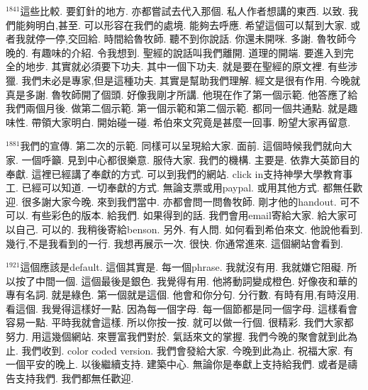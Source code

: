 \documentclass{book}
\begin{document}
$^{1841}$這些比較.
要釘針的地方.
亦都嘗試去代入那個.
私人作者想講的東西.
以致.
我們能夠明白,甚至.
可以形容在我們的處境.
能夠去呼應.
希望這個可以幫到大家.
或者我就停一停,交回給.
時間給魯牧師.
聽不到你說話.
你還未開咪.
多謝.
魯牧師今晚的.
有趣味的介紹.
令我想到.
聖經的說話叫我們離開.
道理的開端.
要進入到完全的地步.
其實就必須要下功夫.
其中一個下功夫.
就是要在聖經的原文裡.
有些涉獵.
我們未必是專家,但是這種功夫.
其實是幫助我們理解.
經文是很有作用.
今晚就真是多謝.
魯牧師開了個頭.
好像我剛才所講.
他現在作了第一個示範.
他答應了給我們兩個月後.
做第二個示範.
第一個示範和第二個示範.
都同一個共通點.
就是趣味性.
帶領大家明白.
開始碰一碰.
希伯來文究竟是甚麼一回事.
盼望大家再留意.

$^{1881}$我們的宣傳.
第二次的示範.
同樣可以呈現給大家.
面前.
這個時候我們就向大家.
一個呼籲.
見到中心都很樂意.
服侍大家.
我們的機構.
主要是.
依靠大英節目的奉獻.
這裡已經講了奉獻的方式.
可以到我們的網站.
click in支持神學大學教育事工.
已經可以知道.
一切奉獻的方式.
無論支票或用paypal.
或用其他方式.
都無任歡迎.
很多謝大家今晚.
來到我們當中.
亦都會問一問魯牧師.
剛才他的handout.
可不可以.
有些彩色的版本.
給我們.
如果得到的話.
我們會用email寄給大家.
給大家可以自己.
可以的.
我稍後寄給benson.
另外.
有人問.
如何看到希伯來文.
他說他看到.
幾行,不是我看到的一行.
我想再展示一次.
很快.
你通常進來.
這個網站會看到.

$^{1921}$這個應該是default.
這個其實是.
每一個phrase.
我就沒有用.
我就嫌它阻礙.
所以按了中間一個.
這個最後是銀色.
我覺得有用.
他將動詞變成橙色.
好像夜和華的專有名詞.
就是綠色.
第一個就是這個.
他會和你分句.
分行數.
有時有用,有時沒用.
看這個.
我覺得這樣好一點.
因為每一個字母.
每一個節都是同一個字母.
這樣看會容易一點.
平時我就會這樣.
所以你按一按.
就可以做一行個.
很精彩.
我們大家都努力.
用這幾個網站.
來豐富我們對於.
氣話來文的掌握.
我們今晚的聚會就到此為止.
我們收到.
color coded version.
我們會發給大家.
今晚到此為止.
祝福大家.
有一個平安的晚上.
以後繼續支持.
建築中心.
無論你是奉獻上支持給我們.
或者是禱告支持我們.
我們都無任歡迎.

\newpage
\end{document}
